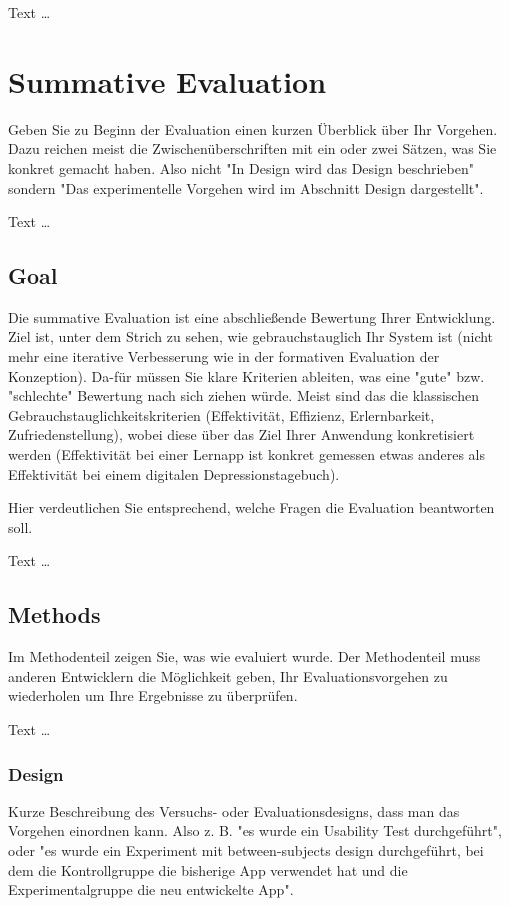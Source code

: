 \documentclass[11pt,a4paper,english]{scrreprt}
\newenvironment{comment}
  {\par\medskip
   \begingroup\color{olive}%
   }
 {\endgroup
  \medskip}
\begin{document}
Text \dots

\newpage
\chapter{Summative Evaluation}\label{chapter:evaluation}
\begin{comment}
Geben Sie zu Beginn der Evaluation einen kurzen Überblick über Ihr Vorgehen. Dazu reichen meist die Zwischenüberschriften mit ein oder zwei Sätzen, was Sie konkret gemacht haben. Also nicht "In Design wird das Design beschrieben" sondern "Das experimentelle Vorgehen wird im Abschnitt Design dargestellt".
\end{comment}

Text \dots

\section{Goal}
\begin{comment}
Die summative Evaluation ist eine abschließende Bewertung Ihrer Entwicklung. Ziel ist, unter dem Strich zu sehen, wie gebrauchstauglich Ihr System ist (nicht mehr eine iterative Verbesserung wie in der formativen Evaluation der Konzeption). Da-für müssen Sie klare Kriterien ableiten, was eine "gute" bzw. "schlechte" Bewertung nach sich ziehen würde. Meist sind das die klassischen Gebrauchstauglichkeitskriterien (Effektivität, Effizienz, Erlernbarkeit, Zufriedenstellung), wobei diese über das Ziel Ihrer Anwendung konkretisiert werden (Effektivität bei einer Lernapp ist konkret gemessen etwas anderes als Effektivität bei einem digitalen Depressionstagebuch).

Hier verdeutlichen Sie entsprechend, welche Fragen die Evaluation beantworten soll.
\end{comment}

Text \dots

\section{Methods}
\begin{comment}
Im Methodenteil zeigen Sie, was wie evaluiert wurde. Der Methodenteil muss anderen Entwicklern die Möglichkeit geben, Ihr Evaluationsvorgehen zu wiederholen um Ihre Ergebnisse zu überprüfen. 
\end{comment}

Text \dots

\subsection{Design}
\begin{comment}
Kurze Beschreibung des Versuchs- oder Evaluationsdesigns, dass man das Vorgehen einordnen kann. Also z. B. "es wurde ein Usability Test durchgeführt", oder "es wurde ein Experiment mit between-subjects design durchgeführt, bei dem die Kontrollgruppe die bisherige App verwendet hat und die Experimentalgruppe die neu entwickelte App".
\end{comment}
\end{document}
